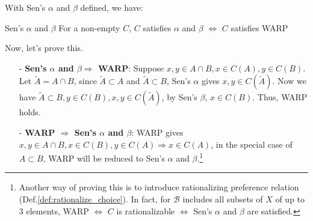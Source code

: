 With Sen's $\alpha$ and $\beta$ defined, we have:
\begin{theorem}{Sen's $\alpha$ and $\beta$}{}
    For a non-empty $C$, $C$ satisfies $\alpha$ and $\beta$ $\Leftrightarrow$ $C$ satisfies WARP
\end{theorem}

Now, let's prove this.
\begin{enumerate}
    \item[-] \textbf{Sen's $\alpha$ and $\beta \Rightarrow$ WARP}: Suppose $x,y\in A\cap B, x\in C(A), y\in C(B)$. Let $\tilde{A}=A\cap B$, since $\tilde{A}\subset A$ and $\tilde{A} \subset B$, Sen's $\alpha$ gives $x,y\in C(\tilde{A})$. Now we have $\tilde{A}\subset B, y\in C(B), x,y\in C(\tilde{A})$, by Sen's $\beta$, $x\in C(B)$. Thus, WARP holds.
    \item[-] \textbf{WARP $\Rightarrow$ Sen's $\alpha$ and $\beta$}: WARP gives $x,y\in A\cap B,x\in C(B), y\in C(A)\Rightarrow x\in C(A)$, in the special case of $A\subset B$, WARP will be reduced to Sen's $\alpha$ and $\beta$.\footnote{Another way of proving this is to introduce rationalizing preference relation (Def.\ref{def:rationalize_choice}). In fact, for $\mathcal{B}$ includes all subsets of $X$ of up to 3 elements, WARP $\Leftrightarrow$ $C$ is rationalizable $\Leftrightarrow$ Sen's $\alpha$ and $\beta$ are satisfied.}
\end{enumerate}